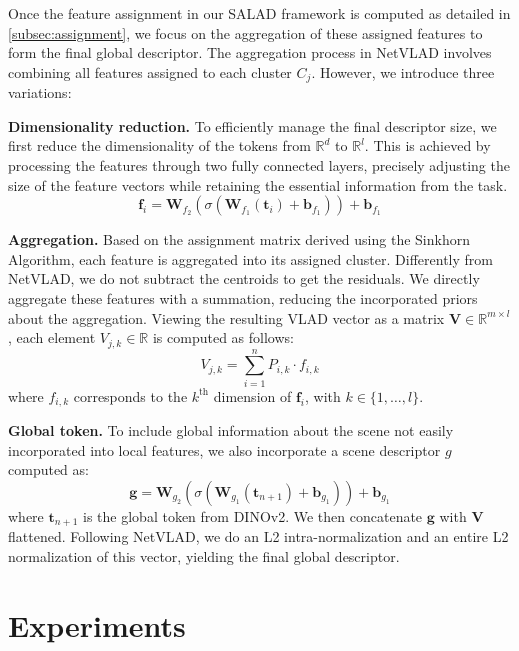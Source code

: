 \documentclass[10pt,twocolumn,letterpaper]{article}
\begin{document}
Once the feature assignment in our SALAD framework is computed as detailed in \cref{subsec:assignment}, we focus on the aggregation of these assigned features to form the final global descriptor. The aggregation process in NetVLAD involves combining all features assigned to each cluster $C_j$. However, we introduce three variations:

\textbf{Dimensionality reduction.} To efficiently manage the final descriptor size, we first reduce the dimensionality of the tokens from $\mathbb{R}^d$ to $\mathbb{R}^l$. This is achieved by processing the features through two fully connected layers, precisely adjusting the size of the feature vectors while retaining the essential information from the task. \begin{equation}
\textbf{f}_i = \mathbf{W}_{f_2}(\sigma(\mathbf{W}_{f_1}(\textbf{t}_i) + \mathbf{b}_{f_1})) + \mathbf{b}_{f_1}
\end{equation}

\textbf{Aggregation.} Based on the assignment matrix derived using the Sinkhorn Algorithm, each feature is aggregated into its assigned cluster. Differently from NetVLAD, we do not subtract the centroids to get the residuals. We directly aggregate these features with a summation, reducing the incorporated priors about the aggregation. Viewing the resulting VLAD vector as a matrix $\textbf{V} \in \mathbb{R}^{m\times l}$, each element $V_{j,k} \in \mathbb{R}$ is computed as follows:
\begin{equation}
V_{j,k} = \sum_{i=1}^{n}{P_{i, k} \cdot f_{i,k}}
\end{equation}
where $f_{i,k}$ corresponds to the $k^{\text{th}}$ dimension of $\textbf{f}_i$, with $k \in \{1, \dots, l \}$.

\textbf{Global token.} To include global information about the scene not easily incorporated into local features, we also incorporate a scene descriptor $g$ computed as:
\begin{equation}
\textbf{g} = \mathbf{W}_{g_2}(\sigma(\mathbf{W}_{g_1}(\textbf{t}_{n+1}) + \mathbf{b}_{g_1})) + \mathbf{b}_{g_1}
\end{equation}
where $\textbf{t}_{n+1}$ is the global token from DINOv2. We then concatenate $\textbf{g}$ with $\textbf{V}$ flattened. Following NetVLAD, we do an L2 intra-normalization and an entire L2 normalization of this vector, yielding the final global descriptor.
 \section{Experiments}
\label{sec:experiments}
\end{document}
